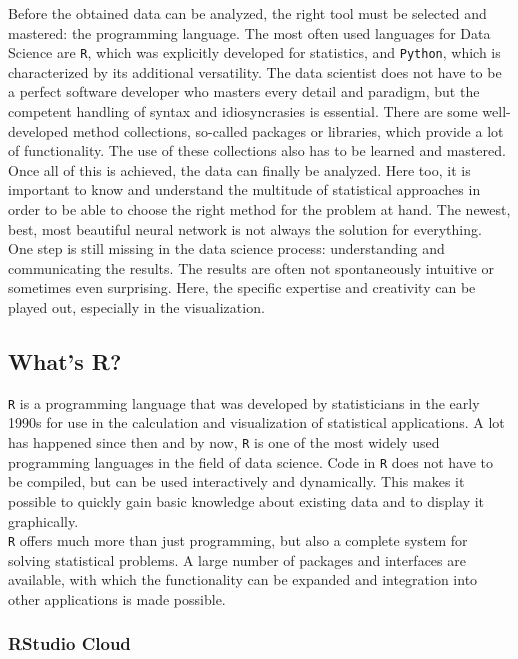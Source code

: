 \documentclass[
  11pt,
]{article}
\begin{document}
Before the obtained data can be analyzed, the right tool must be selected and mastered: the programming language. The most often used languages for Data Science are \texttt{R}, which was explicitly developed for statistics, and \texttt{Python}, which is characterized by its additional versatility. The data scientist does not have to be a perfect software developer who masters every detail and paradigm, but the competent handling of syntax and idiosyncrasies is essential.
There are some well-developed method collections, so-called packages or libraries, which provide a lot of functionality. The use of these collections also has to be learned and mastered.
Once all of this is achieved, the data can finally be analyzed. Here too, it is important to know and understand the multitude of statistical approaches in order to be able to choose the right method for the problem at hand. The newest, best, most beautiful neural network is not always the solution for everything.\\
One step is still missing in the data science process: understanding and communicating the results. The results are often not spontaneously intuitive or sometimes even surprising. Here, the specific expertise and creativity can be played out, especially in the visualization.

\hypertarget{whats-r}{%
\subsection{What's R?}\label{whats-r}}

\texttt{R} is a programming language that was developed by statisticians in the early 1990s for use in the calculation and visualization of statistical applications. A lot has happened since then and by now, \texttt{R} is one of the most widely used programming languages in the field of data science. Code in \texttt{R} does not have to be compiled, but can be used interactively and dynamically. This makes it possible to quickly gain basic knowledge about existing data and to display it graphically.\\
\texttt{R} offers much more than just programming, but also a complete system for solving statistical problems. A large number of packages and interfaces are available, with which the functionality can be expanded and integration into other applications is made possible.

\hypertarget{rstudio-cloud}{%
\subsubsection{RStudio Cloud}\label{rstudio-cloud}}
\end{document}
